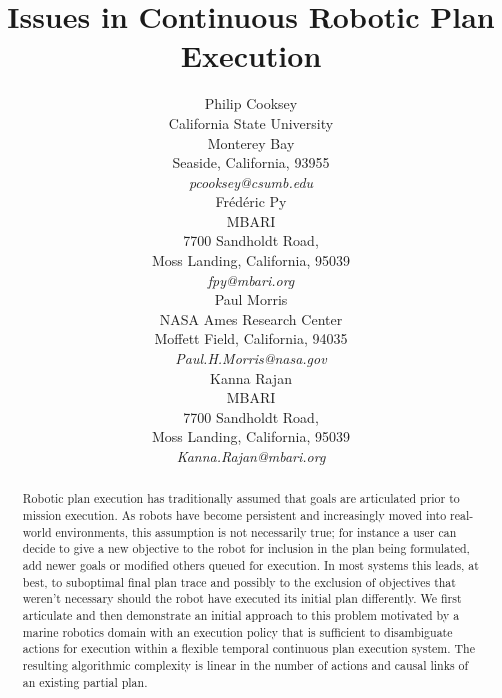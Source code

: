 \documentclass[letterpaper]{article}
\begin{document}
\title{Issues in Continuous Robotic Plan Execution}
\author{Philip Cooksey\\
\small{California State University}\\ 
\small{Monterey Bay}\\
\small{Seaside, California, 93955}\\
\small{\emph{pcooksey@csumb.edu}}\\
\And Fr\'ed\'eric Py\\
\small{MBARI}\\
\small{7700 Sandholdt Road,}\\
\small{Moss Landing, California, 95039}\\
\small{\emph{fpy@mbari.org}}\\
\And Paul Morris\\
\small{NASA Ames Research Center}\\
\small{Moffett Field, California, 94035}\\
\small{\emph{Paul.H.Morris@nasa.gov}}\\
\And Kanna Rajan\\
\small{MBARI}\\
\small{7700 Sandholdt Road,}\\
\small{Moss Landing, California, 95039}\\
\small{\emph{Kanna.Rajan@mbari.org}}\\
}

\maketitle{}

\begin{abstract}

  Robotic plan execution has traditionally assumed that goals are
  articulated prior to mission execution. As robots have become
  persistent and increasingly moved into real-world environments, this
  assumption is not necessarily true; for instance a user can decide
  to give a new objective to the robot for inclusion in the plan being
  formulated, add newer goals or modified others queued for
  execution. In most systems this leads, at best, to suboptimal final
  plan trace and possibly to the exclusion of objectives that weren't
  necessary should the robot have executed its initial plan
  differently.
  We first articulate and then demonstrate an initial approach to this
  problem motivated by a marine robotics domain with an execution
  policy that is sufficient to disambiguate actions for execution
  within a flexible temporal continuous plan execution system.  The
  resulting algorithmic complexity is linear in the number of actions
  and causal links of an existing partial plan.

\end{abstract}
\end{document}
